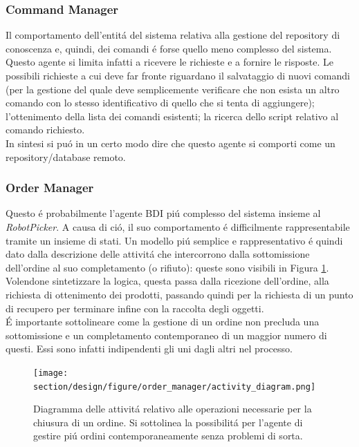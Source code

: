\subsubsection{Command Manager}
Il comportamento dell'entit\'a del sistema relativa alla gestione del repository di conoscenza e, quindi, dei comandi \'e forse quello meno complesso del sistema. Questo agente si limita infatti a ricevere le richieste e a fornire le risposte. Le possibili richieste a cui deve far fronte riguardano il salvataggio di nuovi comandi (per la gestione del quale deve semplicemente verificare che non esista un altro comando con lo stesso identificativo di quello che si tenta di aggiungere); l'ottenimento della lista dei comandi esistenti; la ricerca dello script relativo al comando richiesto.\\
In sintesi si pu\'o in un certo modo dire che questo agente si comporti come un repository/database remoto.

\subsubsection{Order Manager}
Questo \'e probabilmente l'agente BDI pi\'u complesso del sistema insieme al \textit{RobotPicker}. A causa di ci\'o, il suo comportamento \'e difficilmente rappresentabile tramite un insieme di stati. Un modello pi\'u semplice e rappresentativo \'e quindi dato dalla descrizione delle attivit\'a che intercorrono dalla sottomissione dell'ordine al suo completamento (o rifiuto): queste sono visibili in Figura \ref{fig:order-managet-activity-diagram}.\\
Volendone sintetizzare la logica, questa passa dalla ricezione dell'ordine, alla richiesta di ottenimento dei prodotti, passando quindi per la richiesta di un punto di recupero per terminare infine con la raccolta degli oggetti.\\
\'E importante sottolineare come la gestione di un ordine non precluda una sottomissione e un completamento contemporaneo di un maggior numero di questi. Essi sono infatti indipendenti gli uni dagli altri nel processo.
\begin{figure}[!ht]\centering
    \texttt{[image: section/design/figure/order\_manager/activity\_diagram.png]}
    \caption{Diagramma delle attivit\'a relativo alle operazioni necessarie per la chiusura di un ordine. Si sottolinea la possibilit\'a per l'agente di gestire pi\'u ordini contemporaneamente senza problemi di sorta.}
    \label{fig:order-managet-activity-diagram}
\end{figure}

